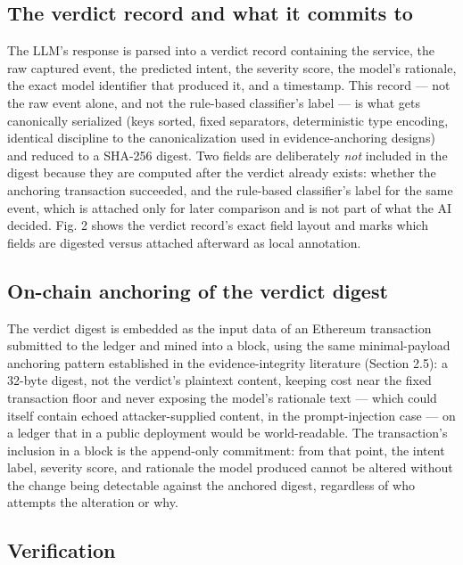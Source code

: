 \documentclass[journal,10pt,twocolumn]{IEEEtran}
\begin{document}
\subsection{The verdict record and what it commits to}

The LLM's response is parsed into a verdict record containing the service, the raw captured event, the predicted intent, the severity score, the model's rationale, the exact model identifier that produced it, and a timestamp. This record --- not the raw event alone, and not the rule-based classifier's label --- is what gets canonically serialized (keys sorted, fixed separators, deterministic type encoding, identical discipline to the canonicalization used in evidence-anchoring designs) and reduced to a SHA-256 digest. Two fields are deliberately \emph{not} included in the digest because they are computed after the verdict already exists: whether the anchoring transaction succeeded, and the rule-based classifier's label for the same event, which is attached only for later comparison and is not part of what the AI decided. Fig. 2 shows the verdict record's exact field layout and marks which fields are digested versus attached afterward as local annotation.

\subsection{On-chain anchoring of the verdict digest}

The verdict digest is embedded as the input data of an Ethereum transaction submitted to the ledger and mined into a block, using the same minimal-payload anchoring pattern established in the evidence-integrity literature (Section 2.5): a 32-byte digest, not the verdict's plaintext content, keeping cost near the fixed transaction floor and never exposing the model's rationale text --- which could itself contain echoed attacker-supplied content, in the prompt-injection case --- on a ledger that in a public deployment would be world-readable. The transaction's inclusion in a block is the append-only commitment: from that point, the intent label, severity score, and rationale the model produced cannot be altered without the change being detectable against the anchored digest, regardless of who attempts the alteration or why.

\subsection{Verification}
\end{document}

